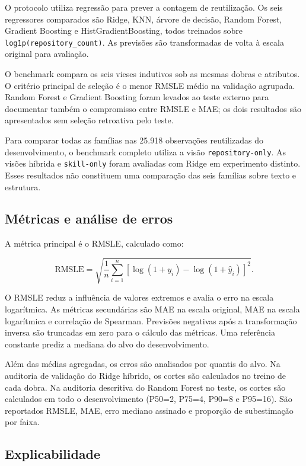 O protocolo utiliza regressão para prever a contagem de reutilização. Os
seis regressores comparados são Ridge, KNN, árvore de decisão, Random
Forest, Gradient Boosting e HistGradientBoosting, todos treinados sobre
\texttt{log1p(repository\_count)}. As previsões são transformadas de
volta à escala original para avaliação.

O benchmark compara os seis vieses indutivos sob as mesmas dobras e
atributos. O critério principal de seleção é o menor RMSLE médio na
validação agrupada. Random Forest e Gradient Boosting foram levados ao
teste externo para documentar também o compromisso entre RMSLE e MAE; os
dois resultados são apresentados sem seleção retroativa pelo teste.

Para comparar todas as famílias nas 25.918 observações reutilizadas do
desenvolvimento, o benchmark completo utiliza a visão
\texttt{repository-only}. As visões híbrida e \texttt{skill-only} foram
avaliadas com Ridge em experimento distinto. Esses resultados não
constituem uma comparação das seis famílias sobre texto e estrutura.

\subsection{Métricas e análise de
erros}\label{muxe9tricas-e-anuxe1lise-de-erros}

A métrica principal é o RMSLE, calculado como:

\[
\mathrm{RMSLE} = \sqrt{\frac{1}{n}\sum_{i=1}^{n}\left[\log(1+y_i)-\log(1+\hat{y}_i)\right]^2}.
\]

O RMSLE reduz a influência de valores extremos e avalia o erro na escala
logarítmica. As métricas secundárias são MAE na escala original, MAE na
escala logarítmica e correlação de Spearman. Previsões negativas após a
transformação inversa são truncadas em zero para o cálculo das métricas.
Uma referência constante prediz a mediana do alvo do desenvolvimento.

Além das médias agregadas, os erros são analisados por quantis do alvo.
Na auditoria de validação do Ridge híbrido, os cortes são calculados no
treino de cada dobra. Na auditoria descritiva do Random Forest no teste,
os cortes são calculados em todo o desenvolvimento (P50=2, P75=4, P90=8
e P95=16). São reportados RMSLE, MAE, erro mediano assinado e proporção
de subestimação por faixa.

\subsection{Explicabilidade}\label{explicabilidade}

